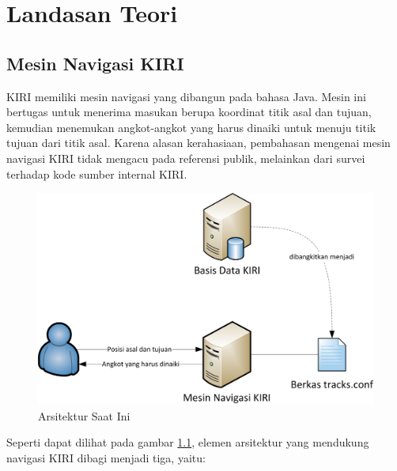 \chapter{Landasan Teori}
\label{chap:pendahuluan}

\section{Mesin Navigasi KIRI}
\label{sec:mesin_navigasi_kiri}

KIRI memiliki mesin navigasi yang dibangun pada bahasa Java. Mesin ini bertugas untuk menerima masukan berupa koordinat titik asal dan tujuan, kemudian menemukan angkot-angkot yang harus dinaiki untuk menuju titik tujuan dari titik asal. Karena alasan kerahasiaan, pembahasan mengenai mesin navigasi KIRI tidak mengacu pada referensi publik, melainkan dari survei terhadap kode sumber internal KIRI.

\begin{figure}
	\centering
	\includegraphics[scale=1]{Gambar/2_arsitektur_saat_ini}
	\caption{Arsitektur Saat Ini} 
	\label{fig:2_arsitektur_saat_ini}
\end{figure}

Seperti dapat dilihat pada gambar \ref{fig:2_arsitektur_saat_ini}, elemen
arsitektur yang mendukung navigasi KIRI dibagi menjadi tiga, yaitu:

